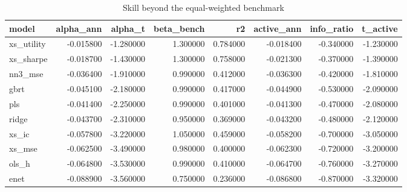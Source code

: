\begin{table}
\caption{Skill beyond the equal-weighted benchmark}
\label{tab:t4_vs_benchmark}
\begin{tabular}{lrrrrrrr}
\toprule
model & alpha\_ann & alpha\_t & beta\_bench & r2 & active\_ann & info\_ratio & t\_active \\
\midrule
xs\_utility & -0.015800 & -1.280000 & 1.300000 & 0.784000 & -0.018400 & -0.340000 & -1.230000 \\
xs\_sharpe & -0.018700 & -1.430000 & 1.300000 & 0.758000 & -0.021300 & -0.370000 & -1.390000 \\
nn3\_mse & -0.036400 & -1.910000 & 0.990000 & 0.412000 & -0.036300 & -0.420000 & -1.810000 \\
gbrt & -0.045100 & -2.180000 & 0.990000 & 0.417000 & -0.044900 & -0.530000 & -2.090000 \\
pls & -0.041400 & -2.250000 & 0.990000 & 0.401000 & -0.041300 & -0.470000 & -2.080000 \\
ridge & -0.043700 & -2.310000 & 0.950000 & 0.369000 & -0.043200 & -0.480000 & -2.120000 \\
xs\_ic & -0.057800 & -3.220000 & 1.050000 & 0.459000 & -0.058200 & -0.700000 & -3.050000 \\
xs\_mse & -0.062500 & -3.490000 & 0.980000 & 0.400000 & -0.062300 & -0.720000 & -3.200000 \\
ols\_h & -0.064800 & -3.530000 & 0.990000 & 0.410000 & -0.064700 & -0.760000 & -3.270000 \\
enet & -0.088900 & -3.560000 & 0.750000 & 0.236000 & -0.086800 & -0.870000 & -3.320000 \\
\bottomrule
\end{tabular}
\end{table}

